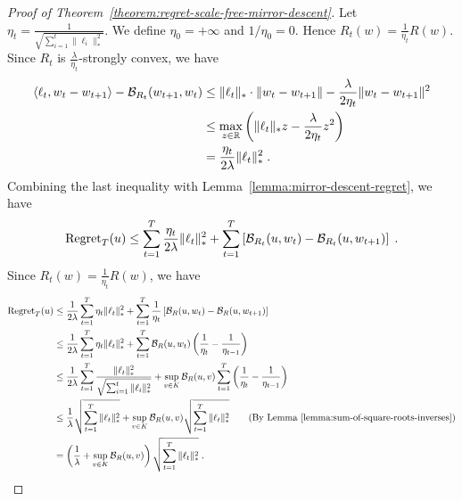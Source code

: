 \begin{proof}[Proof of Theorem~\ref{theorem:regret-scale-free-mirror-descent}]
Let $\eta_t = \frac{1}{\sqrt{\sum_{i=1}^t \|\ell_i\|_*^2}}$. We define $\eta_0
= +\infty$ and $1/\eta_0 = 0$.  Hence $R_t(w) = \frac{1}{\eta_t} R(w)$.  Since
$R_t$ is $\frac{\lambda}{\eta_t}$-strongly convex, we have
\begin{align*}
\langle \ell_t, w_t - w_{t+1} \rangle - \mathcal{B}_{R_t}(w_{t+1}, w_t)
& \le \|\ell_t\|_* \cdot \|w_t - w_{t+1}\| - \frac{\lambda}{2\eta_t} \|w_t - w_{t+1} \|^2 \\
& \le \max_{z \in \mathbb{R}} \left( \|\ell_t\|_* z - \frac{\lambda}{2 \eta_t} z^2 \right) \\
& = \frac{\eta_t}{2\lambda} \|\ell_t\|_*^2 \; .
\end{align*}
Combining the last inequality with Lemma~\ref{lemma:mirror-descent-regret}, we have
$$
\operatorname{Regret}_T(u) \le \sum_{t=1}^T \frac{\eta_t}{2\lambda} \|\ell_t\|_*^2 + \sum_{t=1}^T \left[ \mathcal{B}_{R_t}(u,w_t) - \mathcal{B}_{R_t}(u, w_{t+1}) \right] \; .
$$
Since $R_t(w) = \frac{1}{\eta_t} R(w)$, we have
\begin{align*}
\operatorname{Regret}_T(u)
& \le \frac{1}{2\lambda} \sum_{t=1}^T \eta_t \|\ell_t\|_*^2 + \sum_{t=1}^T \frac{1}{\eta_t} \left[\mathcal{B}_R(u, w_t) - \mathcal{B}_R(u, w_{t+1})\right] \\
& \le \frac{1}{2\lambda} \sum_{t=1}^T \eta_t \|\ell_t\|_*^2 + \sum_{t=1}^T \mathcal{B}_R(u, w_t) \left( \frac{1}{\eta_t} - \frac{1}{\eta_{t-1}} \right) \\
& \le \frac{1}{2\lambda} \sum_{t=1}^T \frac{\|\ell_t\|_*^2}{\sqrt{\sum_{i=1}^t \|\ell_i\|_*^2}} + \sup_{v \in K} \mathcal{B}_R(u,v) \sum_{t=1}^T \left( \frac{1}{\eta_t} - \frac{1}{\eta_{t-1}} \right) \\
& \le \frac{1}{\lambda} \sqrt{\sum_{t=1}^T \|\ell_t\|_*^2} + \sup_{v \in K} \mathcal{B}_R(u,v) \sqrt{\sum_{t=1}^T \|\ell_t\|_*^2} \qquad \text{(By Lemma~\ref{lemma:sum-of-square-roots-inverses})} \\
& = \left( \frac{1}{\lambda} + \sup_{v \in K} \mathcal{B}_R(u,v) \right) \sqrt{\sum_{t=1}^T \|\ell_t\|_*^2} \; .
\end{align*}
\end{proof}

